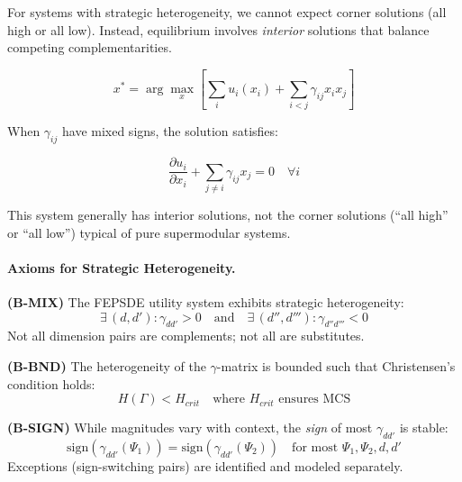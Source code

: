 For systems with strategic heterogeneity, we cannot expect corner solutions 
(all high or all low). Instead, equilibrium involves \emph{interior} solutions 
that balance competing complementarities.

\begin{equation}
x^* = \arg\max_x \left[ \sum_i u_i(x_i) + \sum_{i<j} \gamma_{ij} x_i x_j \right]
\end{equation}

When $\gamma_{ij}$ have mixed signs, the solution satisfies:

\begin{equation}
\frac{\partial u_i}{\partial x_i} + \sum_{j \neq i} \gamma_{ij} x_j = 0
\quad \forall i
\end{equation}

This system generally has interior solutions, not the corner solutions 
(``all high'' or ``all low'') typical of pure supermodular systems.

\paragraph{Axioms for Strategic Heterogeneity.}

\begin{axiom}
\label{ax:B-MIX}
\textbf{(B-MIX)} The FEPSDE utility system exhibits strategic heterogeneity:
\begin{equation}
\exists\, (d, d') : \gamma_{dd'} > 0 \quad \text{and} \quad 
\exists\, (d'', d''') : \gamma_{d''d'''} < 0
\end{equation}
Not all dimension pairs are complements; not all are substitutes.
\end{axiom}

\begin{axiom}
\label{ax:B-BND}
\textbf{(B-BND)} The heterogeneity of the $\gamma$-matrix is bounded such that 
Christensen's condition holds:
\begin{equation}
H(\Gamma) < H_{crit} \quad \text{where } H_{crit} \text{ ensures MCS}
\end{equation}
\end{axiom}

\begin{axiom}
\label{ax:B-SIGN}
\textbf{(B-SIGN)} While magnitudes vary with context, the \emph{sign} of most 
$\gamma_{dd'}$ is stable:
\begin{equation}
\text{sign}(\gamma_{dd'}(\Psi_1)) = \text{sign}(\gamma_{dd'}(\Psi_2)) 
\quad \text{for most } \Psi_1, \Psi_2, d, d'
\end{equation}
Exceptions (sign-switching pairs) are identified and modeled separately.
\end{axiom}

